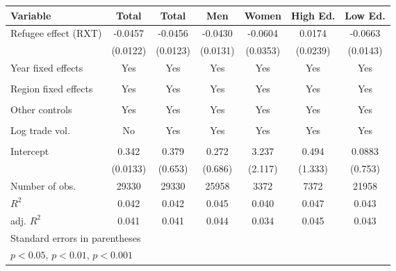 \documentclass{article}
\begin{document}
{\begin{tabular}{l*{6}{c}}
\hline\hline
Variable
            &\multicolumn{1}{c}{Total}&\multicolumn{1}{c}{Total}&\multicolumn{1}{c}{Men}&\multicolumn{1}{c}{Women}&\multicolumn{1}{c}{High Ed.}&\multicolumn{1}{c}{Low Ed.}\\
\hline
Refugee effect (RXT)         &     -0.0457\sym{***}&     -0.0456\sym{***}&     -0.0430\sym{***}&     -0.0604         &      0.0174         &     -0.0663\sym{***}\\
            &    (0.0122)         &    (0.0123)         &    (0.0131)         &    (0.0353)         &    (0.0239)         &    (0.0143)         \\
[1em]
Year fixed effects         &       Yes&       Yes&                     Yes&                    Yes &       Yes&      Yes\\
            &            &            &                     &                     &             &            \\
[1em]
Region fixed effects     &       Yes&       Yes&       Yes&     Yes         &       Yes&       Yes\\
            &           &            &           &             &             &           \\
[1em]
Other controls       &      Yes &      Yes &      Yes &   Yes        &    Yes         &      Yes  \\
            &           &            &           &             &             &            \\
[1em]
Log trade vol.   &                     No&    Yes        &     Yes         &      Yes         &    Yes        &     Yes         \\
            &                     &            &             &            &             &            \\
[1em]
Intercept      &       0.342\sym{***}&       0.379         &       0.272         &       3.237         &       0.494         &      0.0883         \\
            &    (0.0133)         &     (0.653)         &     (0.686)         &     (2.117)         &     (1.333)         &     (0.753)         \\
\hline
Number of obs.       &       29330         &       29330         &       25958         &        3372         &        7372         &       21958         \\
\(R^{2}\)   &       0.042         &       0.042         &       0.045         &       0.040         &       0.047         &       0.043         \\
adj. \(R^{2}\)&       0.041         &       0.041         &       0.044         &       0.034         &       0.045         &       0.043         \\
\hline\hline
\multicolumn{7}{l}{\footnotesize Standard errors in parentheses}\\
\multicolumn{7}{l}{\footnotesize \sym{*} \(p<0.05\), \sym{**} \(p<0.01\), \sym{***} \(p<0.001\)}\\
\end{tabular}
}
\end{document}

